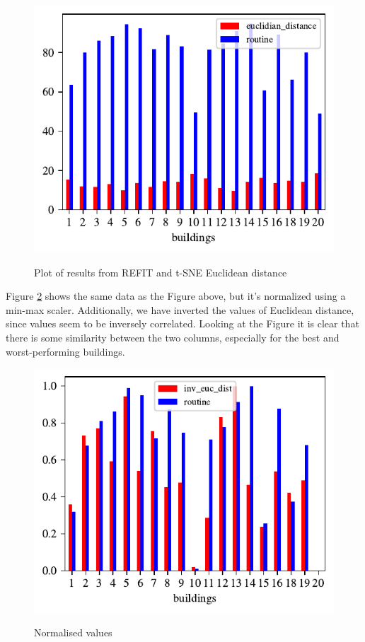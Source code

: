 \begin{figure}[H]
	\centering
	\caption{Plot of results from REFIT and t-SNE Euclidean distance }
	\includegraphics[]{Figures/EC/CORR_TSNE/TSNE_EC_comparison.pdf}
	\label{fig:tsne_comparison}
\end{figure}

Figure \ref{fig:tsne_norm} shows the same data as the Figure above, but it's normalized using a min-max scaler.
Additionally, we have inverted the values of Euclidean distance, since values seem to be inversely correlated.
Looking at the Figure it is clear that there is some similarity between the two columns,
especially for the best and worst-performing buildings.
\begin{figure}[H]
	\centering
	\caption{Normalised values}
	\includegraphics[]{Figures/EC/CORR_TSNE/TSNE_EC_norm.pdf}
	\label{fig:tsne_norm}
\end{figure}

